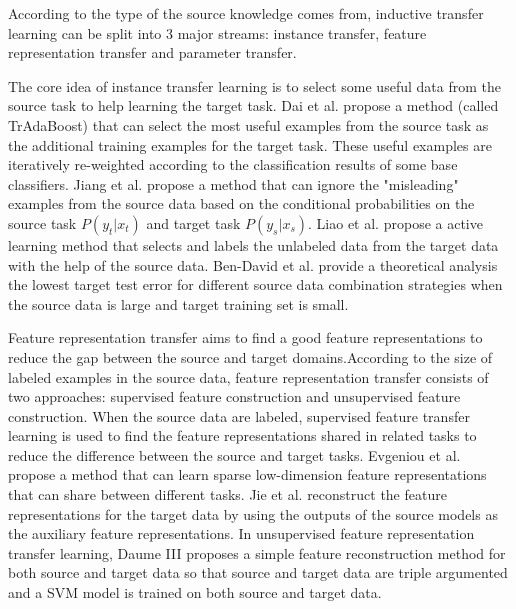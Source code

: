 According to the type of the source knowledge comes from, inductive transfer learning can be split into 3 major streams: instance transfer, feature representation transfer and parameter transfer.

The core idea of instance transfer learning is to select some useful data from the source task to help learning the target task. Dai et al. \cite{dai2007boosting} propose a method (called TrAdaBoost) that can select the most useful examples from the source task as the additional training examples for the target task. These useful examples are iteratively re-weighted according to the classification results of some base classifiers. Jiang et al. \cite{jiang2007instance} propose a method that can ignore the "misleading" examples from the source data based on the conditional probabilities on the source task $P(y_t|x_t)$ and target task $P(y_s|x_s)$. Liao et al. \cite{liao2005logistic} propose a active learning method that selects and labels the unlabeled data from the target data with the help of the source data. Ben-David et al. \cite{ben2010theory} provide a theoretical analysis the lowest target test error for different source data combination strategies when the source data is large and target training set is small.   

Feature representation transfer aims to find a good feature representations to reduce the gap between the source and target domains.According to the size of labeled examples in the source data, feature representation transfer consists of two approaches: supervised feature construction and unsupervised feature construction. When the source data are labeled, supervised feature transfer learning is used to find the feature representations shared in related tasks to reduce the difference between the source and target tasks. Evgeniou et al. \cite{evgeniou2007multi} propose a method that can learn sparse low-dimension feature representations that can share between different tasks. Jie et al. \cite{jie2011multiclass} reconstruct the feature representations for the target data by using the outputs of the source models as the auxiliary feature representations. In unsupervised feature representation transfer learning, Daume III \cite{daume2009frustratingly} proposes a simple feature reconstruction method for both source and target data so that source and target data are triple argumented and a SVM model is trained on both source and target data.

